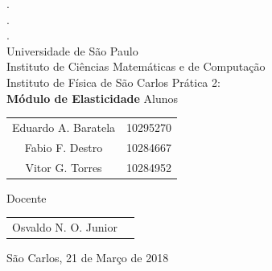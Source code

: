 \documentclass{article}
\begin{document}
\begin{titlepage}
	\centering
	{\Large
	{\color{white}.\\.\\.} \\
	Universidade de São Paulo\\
	Instituto de Ciências Matemáticas e de Computação\\\vspace{1.8mm}
	Instituto de Física de São Carlos}
	\vfill
	Prática 2:\\
	{\Large\textbf{
		Módulo de Elasticidade}}
	\vfill
	Alunos
	\begin{tabular}{c c}
		Eduardo A. Baratela & 10295270\\
		Fabio F. Destro & 10284667\\
		Vitor G. Torres & 10284952
	\end{tabular}
	\vfill
	Docente
	\begin{tabular}{c c}
		Osvaldo N. O. Junior
	\end{tabular}
	\vfill
	São Carlos, 21 de Março de 2018\\
\end{titlepage}
\end{document}

